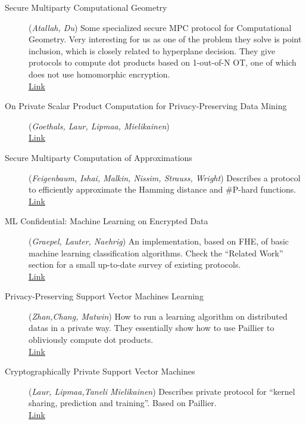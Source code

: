 \documentclass[11pt]{article}
\begin{document}
\begin{description}
	\item[Secure Multiparty Computational Geometry] (\emph{Atallah, Du}) Some specialized secure MPC protocol for Computational Geometry. Very interesting for us as one of the problem they solve is point inclusion, which is closely related to hyperplane decision. They give protocols to compute dot products based on 1-out-of-N OT, one of which does not use homomorphic encryption.
	\\ \href{https://www.cerias.purdue.edu/assets/pdf/bibtex_archive/2001-48.pdf}{Link} 
	
	\item [On Private Scalar Product Computation for Privacy-Preserving Data Mining](\emph{Goethals, Laur, Lipmaa, Mielikainen})
	\\ \href{http://eprints.pascal-network.org/archive/00000295/01/sspfordm.pdf}{Link} 
	
	\item [Secure Multiparty Computation of Approximations](\emph{Feigenbaum, Ishai, Malkin, Nissim, Strauss, Wright}) Describes a protocol to efficiently approximate the Hamming distance and \#P-hard functions.                                               
	\\ \href{http://cs-www.cs.yale.edu/homes/jf/FIMNSW.pdf}{Link}
	
	\item [ML Confidential:	Machine Learning on Encrypted Data](\emph{Graepel, Lauter, Naehrig}) An implementation, based on FHE, of basic machine learning classification algorithms. Check the ``Related Work'' section for a small up-to-date survey of existing protocols.	   
	\\ \href{http://research.microsoft.com/pubs/179548/323.pdf}{Link}
	  
	\item [Privacy-Preserving Support Vector Machines Learning](\emph{Zhan,Chang, Matwin}) How to run a learning algorithm on distributed datas in a private way. They essentially show how to use Paillier to obliviously compute dot products.
	\\ \href{http://iceb.nccu.edu.tw/proceedings/2005/477-482.pdf}{Link}
	                                            
	\item [Cryptographically Private Support Vector Machines](\emph{Laur, Lipmaa,Taneli Mielikainen}) Describes private protocol for ``kernel sharing, prediction and training''. Based on Paillier.
	\\ \href{http://eprint.iacr.org/2006/198.pdf}{Link}
	

\end{description}
\end{document}
